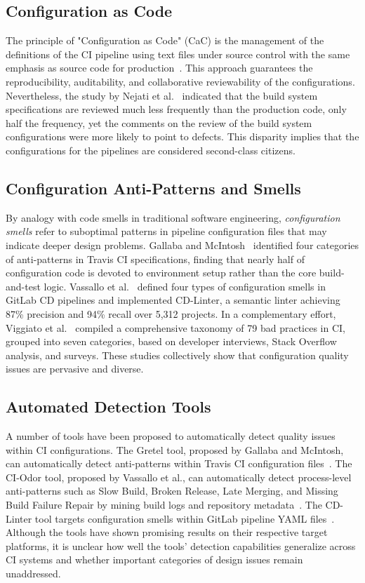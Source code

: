 \documentclass[a4paper,11pt,oneside]{article}
\begin{document}
\subsection{Configuration as Code}

The principle of "Configuration as Code" (CaC) is the management of the definitions of the CI pipeline using text files under source control with the same emphasis as source code for production~\cite{Layman2022}. This approach guarantees the reproducibility, auditability, and collaborative reviewability of the configurations. Nevertheless, the study by Nejati et al.~\cite{Nejati2023} indicated that the build system specifications are reviewed much less frequently than the production code, only half the frequency, yet the comments on the review of the build system configurations were more likely to point to defects. This disparity implies that the configurations for the pipelines are considered second-class citizens.

\subsection{Configuration Anti-Patterns and Smells}

By analogy with code smells in traditional software engineering, \emph{configuration smells} refer to suboptimal patterns in pipeline configuration files that may indicate deeper design problems. Gallaba and McIntosh~\cite{Gallaba2020} identified four categories of anti-patterns in Travis CI specifications, finding that nearly half of configuration code is devoted to environment setup rather than the core build-and-test logic. Vassallo et al.~\cite{Vassallo2020} defined four types of configuration smells in GitLab CD pipelines and implemented CD-Linter, a semantic linter achieving 87\% precision and 94\% recall over 5,312 projects. In a complementary effort, Viggiato et al.~\cite{Viggiato2019} compiled a comprehensive taxonomy of 79 bad practices in CI, grouped into seven categories, based on developer interviews, Stack Overflow analysis, and surveys. These studies collectively show that configuration quality issues are pervasive and diverse.

\subsection{Automated Detection Tools}

A number of tools have been proposed to automatically detect quality issues within CI configurations. The Gretel tool, proposed by Gallaba and McIntosh, can automatically detect anti-patterns within Travis CI configuration files~\cite{Gallaba2020}. The CI-Odor tool, proposed by Vassallo et al., can automatically detect process-level anti-patterns such as Slow Build, Broken Release, Late Merging, and Missing Build Failure Repair by mining build logs and repository metadata~\cite{Vassallo2019}. The CD-Linter tool targets configuration smells within GitLab pipeline YAML files~\cite{Vassallo2020}. Although the tools have shown promising results on their respective target platforms, it is unclear how well the tools' detection capabilities generalize across CI systems and whether important categories of design issues remain unaddressed.
\end{document}
